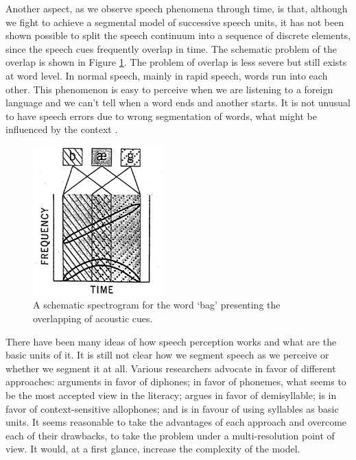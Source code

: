 Another aspect, as we observe speech phenomena through time, is that, although we fight to achieve a segmental model of successive speech units, it has not been shown possible to split the speech continuum into a sequence of discrete elements, since the speech cues frequently overlap in time. The schematic problem of the overlap is shown in Figure \ref{fig:liberman}. The problem of overlap is less severe but still exists at word level. In normal speech, mainly in rapid speech, words run into each other. This phenomenon is easy to perceive when we are listening to a foreign language and we can't tell when a word ends and another starts. It is not unusual to have speech errors due to wrong segmentation of words, what might be influenced by the context \citep{bondgarnes,cole1980}.

\begin{figure}[h!]
\centering
\includegraphics[width=0.45\textwidth]{images/liberman.png}
\caption{A schematic spectrogram for the word `bag' presenting the overlapping of acoustic cues. \citep{liberman1970}}
\label{fig:liberman}
\end{figure}  

There have been many ideas of how speech perception works and what are the basic units of it. It is still not clear how we segment speech as we perceive or whether we segment it at all. Various researchers advocate in favor of different approaches: \cite{klatt1979} arguments in favor of diphones; \cite{pisoni1982} in favor of phonemes, what seems to be the most accepted view in the literacy; \cite{fujimura1978} argues in favor of demisyllable; \cite{wickelgren1969} is in favor of context-sensitive allophones; and \cite{studdert1976} is in favour of using syllables as basic units. It seems reasonable to take the advantages of each approach and overcome each of their drawbacks, to take the problem under a multi-resolution point of view. It would, at a first glance, increase the complexity of the model.


